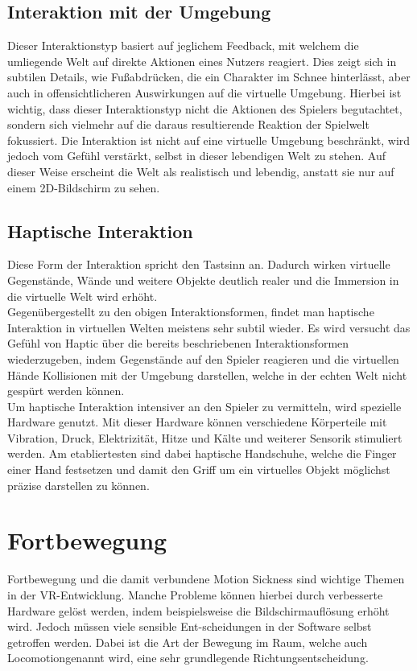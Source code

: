 \subsection{Interaktion mit der Umgebung}
Dieser Interaktionstyp basiert auf jeglichem Feedback, mit welchem die umliegende Welt auf direkte Aktionen eines Nutzers reagiert. Dies zeigt sich in subtilen Details, wie Fußabdrücken, die ein Charakter im Schnee hinterlässt, aber auch in offensichtlicheren Auswirkungen auf die virtuelle Umgebung. Hierbei ist wichtig, dass dieser Interaktionstyp nicht die Aktionen des Spielers begutachtet, sondern sich vielmehr auf die daraus resultierende Reaktion der Spielwelt fokussiert. Die Interaktion ist nicht auf eine virtuelle Umgebung beschränkt, wird jedoch vom Gefühl verstärkt, selbst in dieser lebendigen Welt zu stehen. Auf dieser Weise erscheint die Welt als realistisch und lebendig, anstatt sie nur auf einem 2D-Bildschirm zu sehen.
\newpage
\noindent
\subsection{Haptische Interaktion}
Diese Form der Interaktion spricht den Tastsinn an. Dadurch wirken virtuelle Gegenstände, Wände und weitere Objekte deutlich realer und die Immersion in die virtuelle Welt wird erhöht.\\
Gegenübergestellt zu den obigen Interaktionsformen, findet man haptische Interaktion in virtuellen Welten meistens sehr subtil wieder. Es wird versucht das Gefühl von Haptic über die bereits beschriebenen Interaktionsformen wiederzugeben, indem Gegenstände auf den Spieler reagieren und die virtuellen Hände Kollisionen mit der Umgebung darstellen, welche in der echten Welt nicht gespürt werden können.\\
Um haptische Interaktion intensiver an den Spieler zu vermitteln, wird spezielle Hardware genutzt. Mit dieser Hardware können verschiedene Körperteile mit Vibration, Druck, Elektrizität, Hitze und Kälte und weiterer Sensorik stimuliert werden. Am etabliertesten sind dabei haptische Handschuhe, welche die Finger einer Hand festsetzen und damit den Griff um ein virtuelles Objekt möglichst präzise darstellen zu können.


\section{Fortbewegung}
Fortbewegung und die damit verbundene Motion Sickness sind wichtige Themen in der VR-Entwicklung. Manche Probleme können hierbei durch verbesserte Hardware gelöst werden, indem beispielsweise die Bildschirmauflösung erhöht wird. Jedoch müssen viele sensible Ent-scheidungen in der Software selbst getroffen werden. Dabei ist die Art der Bewegung im Raum, welche auch \dq Locomotion\dq genannt wird, eine sehr grundlegende Richtungsentscheidung.

